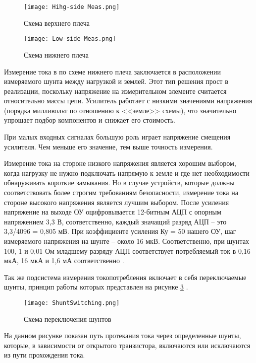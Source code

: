\begin{figure}[H]
  \centering
  \texttt{[image: Hihg-side Meas.png]}
  \caption{Схема верхнего плеча}
  \label{ris:231}
\end{figure}

\begin{figure}[H]
  \centering
  \texttt{[image: Low-side Meas.png]}
  \caption{Схема нижнего плеча}
  \label{ris:232}
\end{figure}

Измерение тока в по схеме нижнего плеча заключается в расположении измеряемого 
шунта между нагрузкой и землей. Этот тип решения прост в реализации, поскольку 
напряжение на измерительном элементе считается относительно массы цепи. Усилитель 
работает с низкими значениями напряжения (порядка милливольт по отношению к <<земле>> схемы), 
что значительно упрощает подбор компонентов и снижает его стоимость.

При малых входных сигналах большую роль играет напряжение 
смещения усилителя. Чем меньше его значение, тем выше точность измерения.

Измерение тока на стороне низкого напряжения является хорошим выбором,
когда нагрузку не нужно подключать напрямую к земле и где нет необходимости обнаруживать 
короткие замыкания. Но в случае устройств, которые должны соответствовать 
более строгим требованиям безопасности, измерение тока на стороне высокого 
напряжения является лучшим выбором.
После усиления напряжение на выходе ОУ оцифровывается 12-битным АЦП с опорным 
напряжением 3,3 В, соответственно, каждый значащий разряд АЦП -- это 3,3/4096 = 0,805 мВ.
При коэффициенте усиления Ку = 50 нашего ОУ, шаг измеряемого напряжения
на шунте -- около 16 мкВ. Соответственно, при шунтах 100, 1 и 0,01 Ом младшему 
разряду АЦП соответствует потребляемый ток в 0,16 мкА, 16 мкА и 1,6 мА соответственно 
\cite{GooglePatent:1}.

Так же подсистема измерения токопотребления включает в себя переключаемые шунты, принцип работы которых 
представлен на рисунке \ref{ris:ShuntSwitching} \cite{GooglePatent:2}.

\begin{figure}[H]
  \centering
  \texttt{[image: ShuntSwitching.png]}
  \caption{Схема переключения шунтов}
  \label{ris:ShuntSwitching}
\end{figure}

На данном рисунке показан путь протекания тока через определенные шунты, которые, в зависимости от 
открытого транзистора, включаются или исключаются из пути прохождения тока. 



